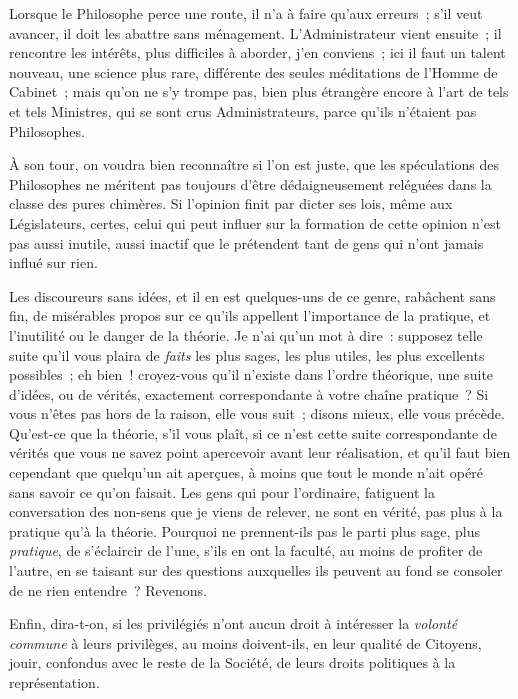 \documentclass[french,twoside]{book} %
\begin{document}
Lorsque le Philosophe perce une route, il n’a à faire qu’aux erreurs ; s’il veut avancer, il doit les abattre sans ménagement. L’Administrateur vient ensuite ; il rencontre les intérêts, plus difficiles à aborder, j’en conviens ; ici il faut un talent nouveau, une science plus rare, différente des seules méditations de l’Homme de Cabinet ; mais qu’on ne s’y trompe pas, bien plus étrangère encore à l’art de tels et tels Ministres, qui se sont crus Administrateurs, parce qu’ils n’étaient pas Philosophes.\par
À son tour, on voudra bien reconnaître si l’on est juste, que les spéculations des Philosophes ne méritent pas toujours d’être dédaigneusement reléguées dans la classe des pures chimères. Si l’opinion finit par dicter ses lois, même aux Législateurs, certes, celui qui peut influer sur la formation de cette opinion n’est pas aussi inutile, aussi inactif que le prétendent tant de gens qui n’ont jamais influé sur rien.\par
Les discoureurs sans idées, et il en est quelques-uns de ce genre, rabâchent sans fin, de misérables propos sur ce qu’ils appellent l’importance de la pratique, et l’inutilité ou le danger de la théorie. Je n’ai qu’un mot à dire : supposez telle suite qu’il vous plaira de {\itshape faits} les plus sages, les plus utiles, les plus excellents possibles ; eh bien ! croyez-vous qu’il n’existe dans l’ordre théorique, une suite d’idées, ou de vérités, exactement correspondante à votre chaîne pratique ? Si vous n’êtes pas hors de la raison, elle vous suit ; disons mieux, elle vous précède. Qu’est-ce que la théorie, s’il vous plaît, si ce n’est cette suite correspondante de vérités que vous ne savez point apercevoir avant leur réalisation, et qu’il faut bien cependant que quelqu’un ait aperçues, à moins que tout le monde n’ait opéré sans savoir ce qu’on faisait. Les gens qui pour l’ordinaire, fatiguent la conversation des non-sens que je viens de relever, ne sont en vérité, pas plus à la pratique qu’à la théorie. Pourquoi ne prennent-ils pas le parti plus sage, plus {\itshape pratique}, de s’éclaircir de l’une, s’ils en ont la faculté, au moins de profiter de l’autre, en se taisant sur des questions auxquelles ils peuvent au fond se consoler de ne rien entendre ? Revenons.\par
Enfin, dira-t-on, si les privilégiés n’ont aucun droit à intéresser la {\itshape volonté commune} à leurs privilèges, au moins doivent-ils, en leur qualité de Citoyens, jouir, confondus avec le reste de la Société, de leurs droits politiques à la représentation.\par
\end{document}
